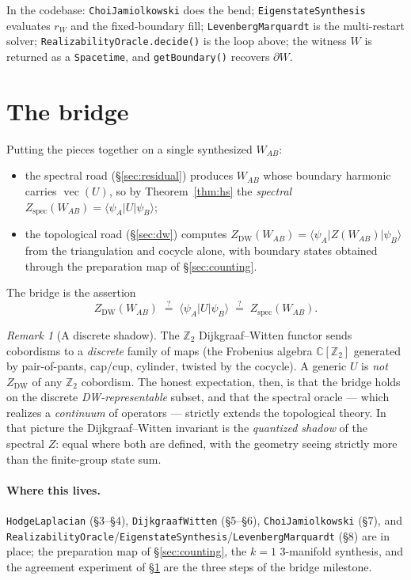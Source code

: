 \documentclass[11pt]{article}
\theoremstyle{plain}
\theoremstyle{definition}
\theoremstyle{remark}
\newtheorem{remark}{Remark}
\newcommand{\C}{\mathbb{C}}
\newcommand{\Z}{\mathbb{Z}}
\newcommand{\vecop}{\operatorname{vec}}
\newcommand{\ip}[3]{\langle #1 \vert #2 \vert #3 \rangle}
\newcommand{\WAB}{W_{\!AB}}
\begin{document}
\noindent
\begin{sloppypar}
In the codebase: \texttt{ChoiJamiolkowski} does the bend;
\texttt{EigenstateSynthesis} evaluates $r_W$ and the fixed-boundary fill;
\texttt{LevenbergMarquardt} is the multi-restart solver;
\texttt{RealizabilityOracle.decide()} is the loop above; the witness $W$ is
returned as a \texttt{Spacetime}, and \texttt{getBoundary()} recovers
$\partial W$.
\end{sloppypar}

\section{The bridge}\label{sec:bridge}

Putting the pieces together on a single synthesized $\WAB$:
\begin{itemize}
\item the spectral road (\S\ref{sec:residual}) produces $\WAB$ whose
  boundary harmonic carries $\vecop(U)$, so by Theorem~\ref{thm:hs} the
  \emph{spectral} $Z_{\mathrm{spec}}(\WAB) = \ip{\psi_A}{U}{\psi_B}$;
\item the topological road (\S\ref{sec:dw}) computes
  $Z_{\mathrm{DW}}(\WAB) = \ip{\psi_A}{Z(\WAB)}{\psi_B}$ from the triangulation
  and cocycle alone, with boundary states obtained through the preparation map
  of \S\ref{sec:counting}.
\end{itemize}
The bridge is the assertion
\begin{equation}
Z_{\mathrm{DW}}(\WAB) \;\overset{?}{=}\; \ip{\psi_A}{U}{\psi_B}
\;\overset{?}{=}\; Z_{\mathrm{spec}}(\WAB).
\end{equation}

\begin{remark}[A discrete shadow]
The $\Z_2$ Dijkgraaf--Witten functor sends cobordisms to a \emph{discrete}
family of maps (the Frobenius algebra $\C[\Z_2]$ generated by pair-of-pants,
cap/cup, cylinder, twisted by the cocycle). A generic $U$ is \emph{not}
$Z_{\mathrm{DW}}$ of any $\Z_2$ cobordism. The honest expectation, then, is that
the bridge holds on the discrete \emph{DW-representable} subset, and that the
spectral oracle --- which realizes a \emph{continuum} of operators --- strictly
extends the topological theory. In that picture the Dijkgraaf--Witten invariant
is the \emph{quantized shadow} of the spectral $Z$: equal where both are defined,
with the geometry seeing strictly more than the finite-group state sum.
\end{remark}

\paragraph{Where this lives.} \texttt{HodgeLaplacian} (\S3--\S4),
\texttt{DijkgraafWitten} (\S5--\S6), \texttt{ChoiJamiolkowski} (\S7), and
\texttt{RealizabilityOracle}/\texttt{EigenstateSynthesis}/\texttt{LevenbergMarquardt}
(\S8) are in place; the preparation map of \S\ref{sec:counting}, the $k{=}1$
3-manifold synthesis, and the agreement experiment of \S\ref{sec:bridge} are the
three steps of the bridge milestone.
\end{document}
